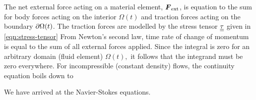 The net external force acting on a material element, $\boldsymbol{F}_\text{ext}$, is equation to the sum for body forces acting on the interior $\Omega(t)$ and traction forces acting on the boundary $\partial\Omega(t)$. The traction forces are modelled by the stress tensor $\underline{\underline{\tau}}$ given in \autoref{eqn:stress-tensor}
From Newton's second law, time rate of change of momentum is equal to the sum of all external forces applied.
Since the integral is zero for an arbitrary domain (fluid element) $\Omega(t),$ it follows that the integrand must be zero everywhere.
For incompressible (constant density) flows, the continuity equation boils down to

We have arrived at the Navier-Stokes equations.

